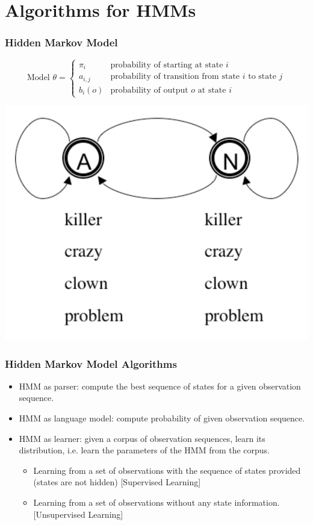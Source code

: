 \section{Algorithms for HMMs}

\begin{frame}
\frametitle{Hidden Markov Model}
\[
\textrm{Model $\theta$} = \left\{ 
\begin{array}{ll} 
\pi_i & \textrm{probability of starting at state $i$} \\ 
a_{i,j} & \textrm{probability of transition from state $i$ to state $j$} \\ 
b_i(o) & \textrm{probability of output $o$ at state $i$}
\end{array} 
\right.\]

\begin{center}
\includegraphics[scale=.4]{figures/hmmfig}
\end{center}
\end{frame}

\begin{frame}
\frametitle{Hidden Markov Model Algorithms}
\begin{itemize}
\item HMM as parser: compute the best sequence of states for a given observation sequence.
\item HMM as language model: compute probability of given observation sequence.
\item HMM as learner: given a corpus of observation sequences, learn its distribution, i.e. learn the parameters of the HMM from the corpus.
\begin{itemize}
\item Learning from a set of observations with the sequence of states provided (states are not hidden) {\color{blue} [Supervised Learning]}
\item Learning from a set of observations without any state information. {\color{blue} [Unsupervised Learning]}
\end{itemize}
\end{itemize}
\end{frame}

